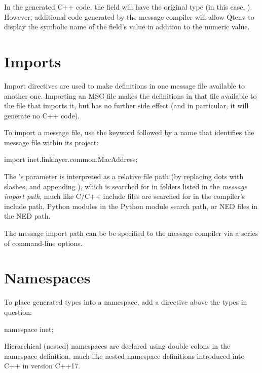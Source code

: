 In the generated C++ code, the field will have the original type (in this case,
). However, additional code generated by the message compiler
will allow Qtenv to display the symbolic name of the field's value in addition
to the numeric value.


\section{Imports}
\label{sec:msg-defs:imports}

Import directives are used to make definitions in one message file available to another
one. Importing an MSG file makes the definitions in that file available to the
file that imports it, but has no further side effect (and in particular, it will
generate no C++ code).

To import a message file, use the  keyword followed by a name
that identifies the message file within its project:

\begin{msg}
import inet.linklayer.common.MacAddress;
\end{msg}

The 's parameter is interpreted as a relative file path (by
replacing dots with slashes, and appending ), which is searched for in
folders listed in the \textit{message import path}, much like C/C++ include
files are searched for in the compiler's include path, Python modules in the
Python module search path, or NED files in the NED path.

The message import path can be be specified to the message compiler via a series
of  command-line options.


\section{Namespaces}
\label{sec:msg-defs:namespaces}
\label{sec:msg-defs:declaring-a-namespace}

To place generated types into a namespace, add a  directive
above the types in question:

\begin{msg}
namespace inet;
\end{msg}

Hierarchical (nested) namespaces are declared using double colons in the
namespace definition, much like nested namespace definitions introduced into
C++ in version C++17.


